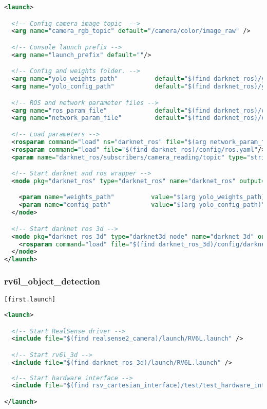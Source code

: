 \begin{lstlisting}[language=xml]
<launch>

  <!-- Config camera image topic  -->
  <arg name="camera_rgb_topic" default="/camera/color/image_raw" />

  <!-- Console launch prefix -->
  <arg name="launch_prefix" default=""/>

  <!-- Config and weights folder. -->
  <arg name="yolo_weights_path"          default="$(find darknet_ros)/yolo_network_config/weights"/>
  <arg name="yolo_config_path"           default="$(find darknet_ros)/yolo_network_config/cfg"/>

  <!-- ROS and network parameter files -->
  <arg name="ros_param_file"             default="$(find darknet_ros)/config/ros.yaml"/>
  <arg name="network_param_file"         default="$(find darknet_ros)/config/RV6L.yaml"/>

  <!-- Load parameters -->
  <rosparam command="load" ns="darknet_ros" file="$(arg network_param_file)"/>
  <rosparam command="load" file="$(find darknet_ros)/config/ros.yaml"/>
  <param name="darknet_ros/subscribers/camera_reading/topic" type="string" value="$(arg camera_rgb_topic)" />

  <!-- Start darknet and ros wrapper -->
  <node pkg="darknet_ros" type="darknet_ros" name="darknet_ros" output="screen" launch-prefix="$(arg launch_prefix)">

    <param name="weights_path"          value="$(arg yolo_weights_path)" />
    <param name="config_path"           value="$(arg yolo_config_path)" />
  </node>

  <!-- Start darknet ros 3d -->
  <node pkg="darknet_ros_3d" type="darknet3d_node" name="darknet_3d" output="screen">
    <rosparam command="load" file="$(find darknet_ros_3d)/config/darknet_3d.yaml" />
  </node>
</launch>
\end{lstlisting}

\subsubsection{rv6l\_object\_detection}

\lstinline{[first.launch]}

\begin{lstlisting}[language=xml]
  <launch>

  <!-- Start RealSense driver -->
  <include file="$(find realsense2_camera)/launch/RV6L.launch" />

  <!-- Start rv6l_3d -->
  <include file="$(find darknet_ros_3d)/launch/RV6L.launch" />
  
  <!-- Start hardware interface -->
  <include file="$(find rsv_cartesian_interface)/test/test_hardware_interface.launch" /> 

</launch>
\end{lstlisting}


